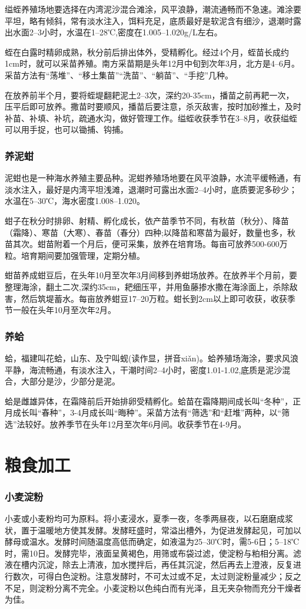 \documentclass{ctexbook}
\begin{document}
缢蛭养殖场地要选择在内湾泥沙混合滩涂，风平浪静，潮流通畅而不急速。滩涂要平坦，略有倾斜，常有淡水注入，饵料充足，底质最好是软泥含有细沙，退潮时露出水面2--3小时，水温在1--28℃,密度在1.005--1.020g/L左右。

蛭在白露时精卵成熟，秋分前后排出体外，受精孵化。经过4个月，蛭苗长成约1cm时，就可以采苗养殖。南方采苗期是头年12月中旬到次年3月，北方是4--6月。采苗方法有“荡堆”、“移土集苗”“洗苗”、“躺苗”、“手挖”几种。

在放养前半个月，要将蛭堤翻耙泥土2--3次，深约20-35cm，播苗之前再耙一次，压平后即可放养。撒苗时要顺风，播苗后要注意，杀灭敌害，按时加砂推土，及时补苗、补填、补坑，疏通水沟，做好管理工作。缢蛭收获季节在3--8月，收获缢蛭可以用手捉，也可以锄捕、钩捕。
\subsection{养泥蚶}
泥蚶也是一种海水养殖主要品种。泥蚶养殖场地要在风平浪静，水流平缓畅通，有淡水注入，最好是内湾平坦浅滩，退潮时可露出水面2--4小时，底质要泥多砂少；水温在5--30℃，海水密度1.008--1.020。

蚶子在秋分时排卵、射精、孵化成长，依产苗季节不同，有秋苗（秋分）、降苗（霜降）、寒苗（大寒）、春苗（春分）四种;以降苗和寒苗为最好，数量也多，秋苗其次。蚶苗附着一个月后，便可采集，放养在培育场。每亩可放养500-600万粒。培育期间要加强管理，定期分植。

蚶苗养成蚶豆后，在头年10月至次年3月间移到养蚶场放养。在放养半个月前，要整理海涂，翻土二次,深约35cm，耙细压平，并用鱼藤掺水撒在海涂面上，杀除敌害，然后筑堤蓄水。每亩放养蚶豆17--20万粒。蚶长到2cm以上即可收获，收获季节一般在头年10月至次年2月。

\subsection{养蛤}
蛤，福建叫花蛤，山东、及宁叫蚬(读作显，拼音xiǎn)。蛤养殖场海涂，要求风浪平静，海流畅通，有淡水注入，干潮时间2--4小时，密度1.01-1.02,底质是泥沙混合，大部分是沙，少部分是泥。

蛤是雌雄异体，在霜降前后开始排卵受精孵化。蛤苗在霜降期间成长叫“冬种”，正月成长叫“春种”，3-4月成长叫“晦种”。采苗方法有“筛选”和“赶堆”两种，以“筛选”法较好。放养季节在头年12月至次年6月间。收获季节在4-9月。
\chapter{粮食加工}
\subsection{小麦淀粉}
小麦或小麦粉均可为原料。将小麦浸水，夏季一夜，冬季两昼夜，以石磨磨成浆状，置于温暖地方使其发酵。发酵旺盛时，常溢出槽外，为促进发酵起见，可加以酵母或温水。发酵时间随温度高低而确定，如液温为25--30℃时，需5-6日；5--18℃时，需10日。发酵完毕，液面呈黄褐色，用筛或布袋过滤，使淀粉与粕相分离。滤液在槽内沉淀，除去上清液，加水搅拌后，再任其沉淀，然后再去上澄液，反复进行数次，可得白色淀粉。注意发酵时，不可太过或不足，太过则淀粉量减少；反之不足，则淀粉分离不完全。小麦淀粉以色纯白而有光泽，且无夹杂物而充分干燥者为佳。
\end{document}
